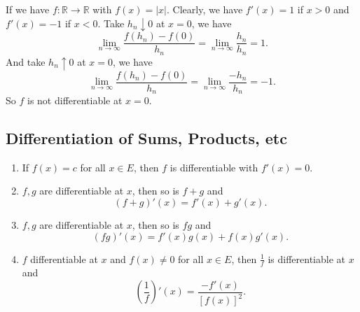 \begin{example}
    If we have \(f: \mathbb{R}\to \mathbb{R}\) with \(f(x) = \left\vert x \right\vert \). Clearly, we have
    \(f'(x) = 1\) if \(x > 0\) and \(f'(x) = -1\) if \(x < 0\). Take \(h_n \downarrow 0\) at \(x = 0\), we have
    \[
        \lim\limits_{n \to \infty} \frac{f(h_n) - f(0)}{h_n} = \lim\limits_{n \to \infty} \frac{h_n}{h_n} = 1.
    \]
    And take \(h_n \uparrow 0\) at \(x = 0\), we have
    \[
        \lim\limits_{n \to \infty} \frac{f(h_n) - f(0)}{h_n} = \lim\limits_{n \to \infty} \frac{-h_n}{h_n} = -1.
    \]
    So \(f\) is not differentiable at \(x = 0\).
\end{example}
\subsection{Differentiation of Sums, Products, etc}
\begin{property}
\leavevmode
\begin{enumerate}
    \label{derivprop}
    \item If \(f(x) = c\) for all \(x \in E\), then \(f\) is differentiable with \(f'(x) = 0\).
    \item \(f, g\) are differentiable at \(x\), then so is \(f + g\) and
    \[
        (f+g)'(x) = f'(x) + g'(x).
    \]
    \item \(f,g\) are differentiable at \(x\), then so is \(fg\) and
    \[
        (fg)'(x) = f'(x)g(x) + f(x)g'(x).
    \]
    \item \(f\) differentiable at \(x\) and \(f(x) \neq 0\) for all \(x \in E\), then \(\frac{1}{f}\) is differentiable at \(x\) and
    \[
        (\frac{1}{f})'(x) = \frac{-f'(x)}{[f(x)]^2}.
    \]
\end{enumerate}
\end{property}
